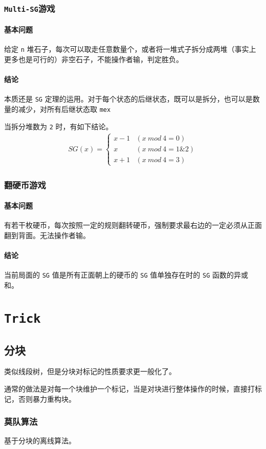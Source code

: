 \documentclass[UTF-8]{ctexart}
\begin{document}
	\subsubsection{\texttt{Multi-SG}游戏}
	\paragraph{基本问题} 给定 \texttt{n} 堆石子，每次可以取走任意数量个，或者将一堆式子拆分成两堆（事实上更多也是可行的）非空石子，不能操作者输，判定胜负。
	\paragraph{结论} 本质还是 \texttt{SG} 定理的运用。对于每个状态的后继状态，既可以是拆分，也可以是数量的减少，对所有后继状态取 \texttt{mex}
	
	当拆分堆数为 \texttt{2} 时，有如下结论。
	\begin{align}
	SG(x)=\begin{cases} x-1&(x\ mod\ 4=0)\\ x&(x\ mod\ 4=1\&2)\\ x+1&(x\ mod\ 4=3) \end{cases}\nonumber		
	\end{align}
	\subsubsection{翻硬币游戏}
	\paragraph{基本问题}有若干枚硬币，每次按照一定的规则翻转硬币，强制要求最右边的一定必须从正面翻到背面。无法操作者输。
	\paragraph{结论}当前局面的 \texttt{SG} 值是所有正面朝上的硬币的 \texttt{SG} 值单独存在时的 \texttt{SG} 函数的异或和。
	\newpage
	\section{\texttt{Trick}}
	\subsection{分块}
	类似线段树，但是分块对标记的性质要求更一般化了。
	
	通常的做法是对每一个块维护一个标记，当是对块进行整体操作的时候，直接打标记，否则暴力重构块。
	\subsubsection{莫队算法}
	基于分块的离线算法。
	
\end{document}
